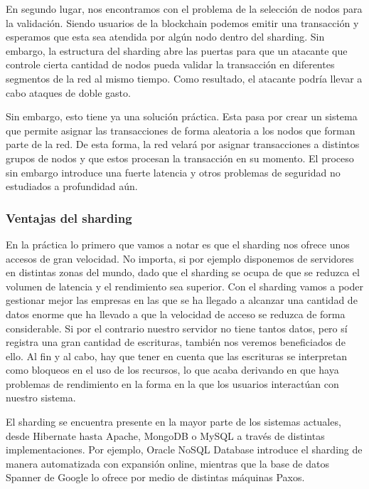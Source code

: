 \documentclass[twoside,twocolumn]{article}
\begin{document}
En segundo lugar, nos encontramos con el problema de la selección
 de nodos para la validación. Siendo usuarios de la blockchain podemos
  emitir una transacción y esperamos que esta sea atendida por algún nodo
   dentro del sharding. Sin embargo, la estructura del sharding abre las 
   puertas para que un atacante que controle cierta cantidad de nodos pueda
    validar la transacción en diferentes segmentos de la red al mismo tiempo.
     Como resultado, el atacante podría llevar a cabo ataques de doble gasto.

Sin embargo, esto tiene ya una solución práctica.
 Esta pasa por crear un sistema que permite asignar las 
 transacciones de forma aleatoria a los nodos que forman parte
  de la red. De esta forma, la red velará por asignar transacciones
   a distintos grupos de nodos y que estos procesan la transacción 
   en su momento. El proceso sin embargo introduce una fuerte latencia 
   y otros problemas de seguridad no estudiados a profundidad aún.
\subsubsection{Ventajas del sharding}

En la práctica lo primero que vamos a notar es que el sharding nos ofrece unos 
accesos de gran velocidad. No importa, si por ejemplo disponemos de servidores 
en distintas zonas del mundo, dado que el sharding se ocupa de que se reduzca 
el volumen de latencia y el rendimiento sea superior. Con el sharding vamos a 
poder gestionar mejor las empresas en las que se ha llegado a alcanzar una 
cantidad de datos enorme que ha llevado a que la velocidad de acceso se reduzca 
de forma considerable. Si por el contrario nuestro servidor no tiene tantos datos,
 pero sí registra una gran cantidad de escrituras, también nos veremos 
 beneficiados de ello. Al fin y al cabo, hay que tener en cuenta que las
  escrituras se interpretan como bloqueos en el uso de los recursos, lo que
   acaba derivando en que haya problemas de rendimiento en la forma en la que 
   los usuarios interactúan con nuestro sistema.

El sharding se encuentra presente en la mayor parte de los sistemas actuales,
 desde Hibernate hasta Apache, MongoDB o MySQL a través de distintas 
 implementaciones. Por ejemplo, Oracle NoSQL Database introduce el sharding
  de manera automatizada con expansión online, mientras que la base de datos 
  Spanner de Google lo ofrece por medio de distintas máquinas Paxos.
\end{document}
